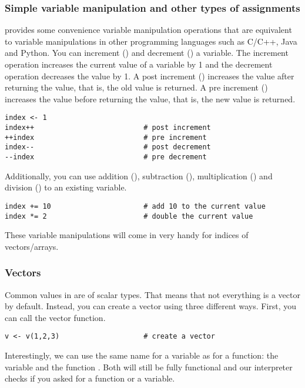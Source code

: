 \subsubsection{Simple variable manipulation and other types of assignments}
\Rev provides some convenience variable manipulation operations that are equivalent to variable manipulations in other programming languages such as C/C++, Java and Python.
You can increment (\cl{++}) and decrement (\cl{-\,-}) a variable.
The increment operation increases the current value of a variable by 1 and the decrement operation decreases the value by 1.
A post increment () increases the value after returning the value, that is, the old value is returned.
A pre increment () increases the value before returning the value, that is, the new value is returned.
{\tt \begin{snugshade*}
\begin{lstlisting}    
index <- 1
index++                          # post increment
++index                          # pre increment
index--                          # post decrement
--index                          # pre decrement
\end{lstlisting}
\end{snugshade*}}
Additionally, you can use addition (), subtraction (), multiplication () and division () to an existing variable.
{\tt \begin{snugshade*}
\begin{lstlisting}    
index += 10                      # add 10 to the current value
index *= 2                       # double the current value
\end{lstlisting}
\end{snugshade*}}
These variable manipulations will come in very handy for indices of vectors/arrays.

\subsubsection{Vectors}
Common values in \RevBayes are of scalar types.
That means that not everything is a vector by default.
Instead, you can create a vector using three different ways.
First, you can call the vector function.
{\tt \begin{snugshade*}
\begin{lstlisting}    
v <- v(1,2,3)                    # create a vector
\end{lstlisting}
\end{snugshade*}}
Interestingly, we can use the same name for a variable as for a function: the variable  and the function .
Both will still be fully functional and our interpreter checks if you asked for a function or a variable.

